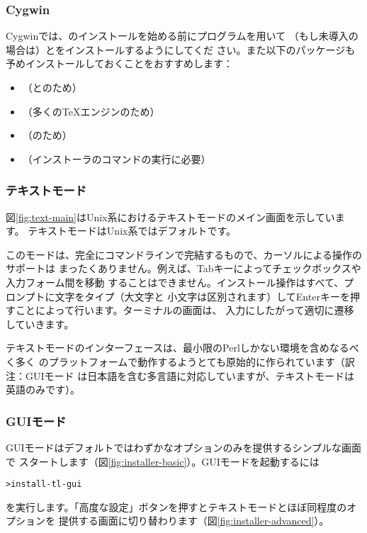 \documentclass[uplatex,dvipdfmx,12pt,tombow]{jsarticle}
\begin{document}
\subsubsection{Cygwin}
\label{sec:cygwin}

Cygwinでは、\TL のインストールを始める前にプログラムを用いて
（もし未導入の場合は）とをインストールするようにしてくだ
さい。また以下のパッケージも予めインストールしておくことをおすすめします：
%
\begin{itemize}
\item {}（\XeTeX と\LuaTeX のため）
\item {}（多くの\TeX エンジンのため）
\item {}（のため）
\item {}（インストーラのコマンドの実行に必要）
\end{itemize}

\subsubsection{テキストモード}

図\ref{fig:text-main}はUnix系におけるテキストモードのメイン画面を示しています。
テキストモードはUnix系ではデフォルトです。

このモードは、完全にコマンドラインで完結するもので、カーソルによる操作のサポートは
まったくありません。例えば、Tabキーによってチェックボックスや入力フォーム間を移動
することはできません。インストール操作はすべて、プロンプトに文字をタイプ（大文字と
小文字は区別されます）してEnterキーを押すことによって行います。ターミナルの画面は、
入力にしたがって適切に遷移していきます。

テキストモードのインターフェースは、最小限のPerlしかない環境を含めなるべく多く
のプラットフォームで動作するようとても原始的に作られています（訳注：GUIモード
は日本語を含む多言語に対応していますが、テキストモードは英語のみです）。

\subsubsection{GUIモード}
\label{sec:graphical-inst}

GUIモードはデフォルトではわずかなオプションのみを提供するシンプルな画面で
スタートします（図\ref{fig:installer-basic}）。GUIモードを起動するには
%
\begin{alltt}
> install-tl -gui
\end{alltt}
%
を実行します。「高度な設定」ボタンを押すとテキストモードとほぼ同程度のオプションを
提供する画面に切り替わります（図\ref{fig:installer-advanced}）。
\end{document}
